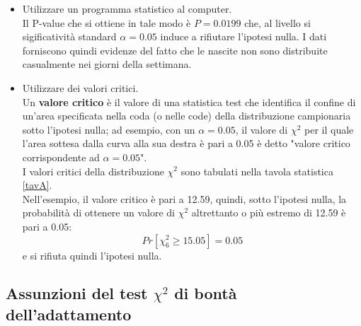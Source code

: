 \documentclass[10pt, draft]{book}
\begin{document}
\begin{itemize}
    \item Utilizzare un programma statistico al computer.
    \\
    Il P-value che si ottiene in tale modo è $P = 0.0199$ che, al livello si sigificatività standard $\alpha = 0.05$ induce a rifiutare l'ipotesi nulla. I dati forniscono quindi evidenze del fatto che le nascite non sono distribuite casualmente nei giorni della settimana.
    \item Utilizzare dei valori critici.
    \\
    Un \textbf{valore critico} è il valore di una statistica test che identifica il confine di un'area specificata nella coda (o nelle code) della distribuzione campionaria sotto l'ipotesi nulla; ad esempio, con un $\alpha = 0.05$, il valore di $\chi^2$ per il quale l'area sottesa dalla curva alla sua destra è pari a 0.05 è detto "valore critico corrispondente ad $\alpha = 0.05$".
    \\
    I valori critici della distribuzione $\chi^2$ sono tabulati nella tavola statistica \ref{tavA}.
    \\
    Nell'esempio, il valore critico è pari a 12.59, quindi, sotto l'ipotesi nulla, la probabilità di ottenere un valore di $\chi^2$ altrettanto o più estremo di 12.59 è pari a 0.05:
    \begin{equation}
    Pr[\chi^2_6 \ge 15.05] = 0.05
    \end{equation}
    e si rifiuta quindi l'ipotesi nulla.
\end{itemize}

\subsection{Assunzioni del test \texorpdfstring{$\chi^2$}{Lg} di bontà dell'adattamento}
\end{document}
